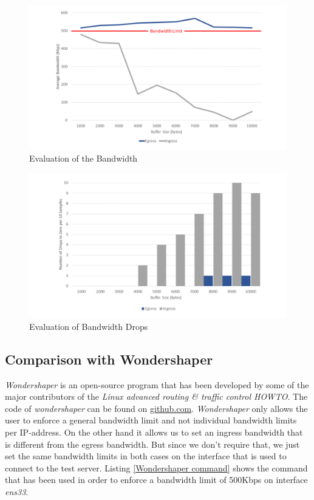 \begin{figure}[h]
	\centering
	\includegraphics[width=\textwidth]{img/Evaluation-Bandwidth.png}
	\caption{Evaluation of the Bandwidth}
	\label{Evaluation of the Bandwidth}
\end{figure}

\begin{figure}[h]
	\centering
	\includegraphics[width=\textwidth]{img/Evaluation-Zeros.png}
	\caption{Evaluation of Bandwidth Drops}
	\label{Evaluation of the Bandwidth Drops}
\end{figure}

\newpage
\textit{ }
\newpage
\subsection{Comparison with Wondershaper}

\textit{Wondershaper} is an open-source program that has been developed by some of the major contributors of the \textit{Linux advanced routing \& traffic control HOWTO}\cite
{hubert2002linux}. The code of \textit{wondershaper} can be found on \href{https://github.com/magnific0/wondershaper}{github.com}\cite{hubert2002wondershaper}. \textit{Wondershaper} only allows the user to enforce a general bandwidth limit and not individual bandwidth limits per \acs{IP}-address. On the other hand it allows us to set an ingress bandwidth that is different from the egress bandwidth. But since we don't require that, we just set the same bandwidth limits in both cases on the interface that is used to connect to the test server. Listing \ref{Wondershaper command} shows the command that has been used in order to enforce a bandwidth limit of 500Kbps on interface \textit{ens33}.

